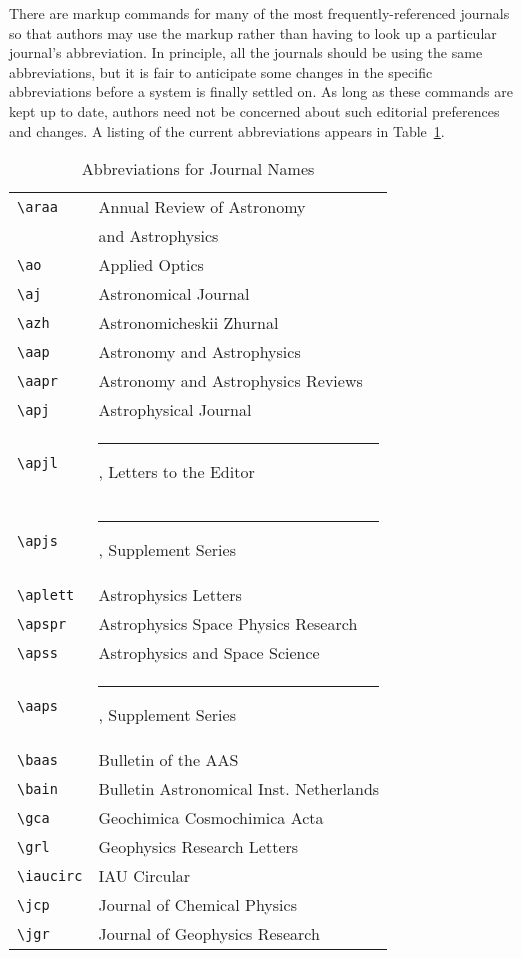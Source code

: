 \documentclass[preprint2]{aastex}
\begin{document}
There are markup commands for many of the most frequently-referenced journals so  that authors may use the markup  rather than having 
to look up a particular journal's abbreviation. 
In principle, all the journals should be using the 
same abbreviations, but it is fair to anticipate some changes in 
the specific abbreviations before a system is finally settled on.  As 
long as these commands are kept up to date, authors need not be 
concerned about such editorial preferences and changes. 
A listing of the current abbreviations appears in Table~\ref{journame}. 
\begin{table} 
\begin{center} 
\caption{Abbreviations for Journal Names}\label{journame} 
\begin{tabular}{ll} 
\verb"\araa" & Annual Review of Astronomy\\ 
  & \hspace*{1em} and Astrophysics\\ 
\verb"\ao" & Applied Optics\\ 
\verb"\aj" & Astronomical Journal\\ 
\verb"\azh" & Astronomicheskii Zhurnal\\ 
\verb"\aap" & Astronomy and Astrophysics\\ 
\verb"\aapr" & Astronomy and Astrophysics Reviews\\ 
\verb"\apj" & Astrophysical Journal\\ 
\verb"\apjl" & \rule[.5ex]{2em}{.4pt}, Letters to the Editor\\ 
\verb"\apjs" & \rule[.5ex]{2em}{.4pt}, Supplement Series\\ 
\verb"\aplett" & Astrophysics Letters\\ 
\verb"\apspr" & Astrophysics Space Physics Research\\ 
\verb"\apss" & Astrophysics and Space Science\\ 
\verb"\aaps" & \rule[.5ex]{2em}{.4pt}, Supplement Series\\ 
\verb"\baas" & Bulletin of the AAS\\ 
\verb"\bain" & Bulletin Astronomical Inst. Netherlands\\ 
\verb"\gca" & Geochimica Cosmochimica Acta\\ 
\verb"\grl" & Geophysics Research Letters\\ 
\verb"\iaucirc" & IAU Circular\\ 
\verb"\jcp" & Journal of Chemical Physics\\ 
\verb"\jgr" & Journal of Geophysics Research\\ 

\end{tabular}
\end{center}
\end{table}
\end{document}
